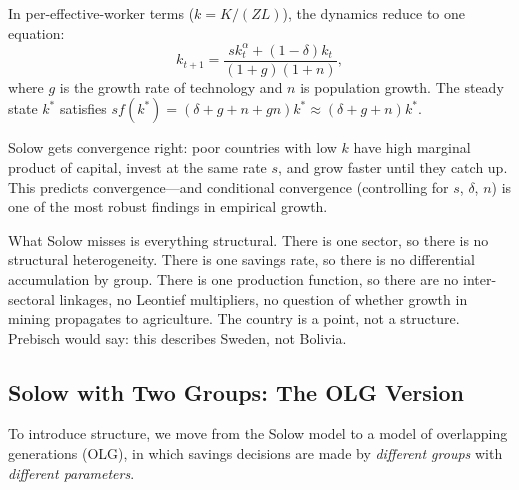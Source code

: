 \documentclass[../structural_economics_book.tex]{subfiles}
\begin{document}
In per-effective-worker terms ($k = K/(ZL)$), the dynamics reduce to one equation:
\begin{equation}\label{ch03:eq:solow}
k_{t+1} = \frac{s k_t^\alpha + (1-\delta)k_t}{(1+g)(1+n)},
\end{equation}
where $g$ is the growth rate of technology and $n$ is population growth. The steady state $k^*$ satisfies $sf(k^*) = (\delta + g + n + gn)k^* \approx (\delta + g + n)k^*$.

\begin{intuition}
Solow gets convergence right: poor countries with low $k$ have high marginal product of capital, invest at the same rate $s$, and grow faster until they catch up. This predicts convergence---and conditional convergence (controlling for $s$, $\delta$, $n$) is one of the most robust findings in empirical growth.

What Solow misses is everything structural. There is one sector, so there is no structural heterogeneity. There is one savings rate, so there is no differential accumulation by group. There is one production function, so there are no inter-sectoral linkages, no Leontief multipliers, no question of whether growth in mining propagates to agriculture. The country is a point, not a structure. Prebisch would say: this describes Sweden, not Bolivia.
\end{intuition}


\subsection{Solow with Two Groups: The OLG Version}

To introduce structure, we move from the Solow model to a model of overlapping generations (OLG), in which savings decisions are made by \textit{different groups} with \textit{different parameters}.
\end{document}
